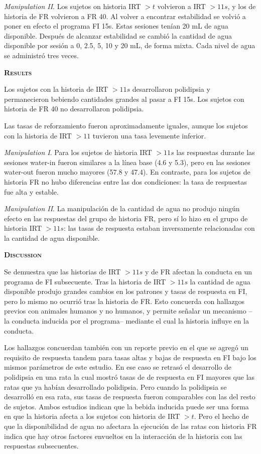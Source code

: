 \documentclass[a4paper,12pt]{article}
\begin{document}
{\itshape Manipulation II}. Los sujetos on historia IRT $> t$ volvieron a IRT $> 11s$, y los de historia de FR volvieron a FR 40. Al volver a encontrar estabilidad se volvió a poner en efecto el programa FI 15s. Estas sesiones tenían 20 mL de agua disponible. Después de alcanzar estabilidad se cambió la cantidad de agua disponible por sesión a 0, 2.5, 5, 10 y 20 mL, de forma mixta. Cada nivel de agua se administró tres veces.

{\scshape\bfseries Results}

Los sujetos con la historia de IRT $> 11s$ desarrollaron polidipsia y permanecieron bebiendo cantidades grandes al pasar a FI 15s. Los sujetos con historia de FR 40 no desarrollaron polidipsia.

Las tasas de reforzamiento fueron aproximadamente iguales, aunque los sujetos con la historia de IRT $> 11$ tuvieron una tasa levemente inferior.

{\itshape Manipulation I}. Para los sujetos de historia IRT $> 11s$ las respuestas durante las sesiones water-in fueron similares a la línea base (4.6 y 5.3), pero en las sesiones water-out fueron mucho mayores (57.8 y 47.4). En contraste, para los sujetos de historia FR no hubo diferencias entre las dos condiciones: la tasa de respuestas fue alta y estable.

{\itshape Manipulation II}. La manipulación de la cantidad de agua no produjo ningún efecto en las respuestas del grupo de historia FR, pero sí lo hizo en el grupo de historia IRT $> 11s$: las tasas de respuesta estaban inversamente relacionadas con la cantidad de agua disponible.

{\scshape\bfseries Discussion}

Se demuestra que las historias de IRT $> 11s$ y de FR afectan la conducta en un programa de FI subsecuente. Tras la historia de IRT $> 11s$ la cantidad de agua disponible produjo grandes cambios en los patrones y tasas de respuesta en FI, pero lo mismo no ocurrió tras la historia de FR. Esto concuerda con hallazgos previos con animales humanos y no humanos, y permite señalar un mecanismo --la conducta inducida por el programa-- mediante el cual la historia influye en la conducta.

Los hallazgos concuerdan también con un reporte previo en el que se agregó un requisito de respuesta tandem para tasas altas y bajas de respuesta en FI bajo los mismos parámetros de este estudio. En ese caso se retrasó el desarrollo de polidipsia en una rata la cual mostró tasas de de respuesta en FI mayores que las ratas que ya habían desarrollado polidipsia. Pero cuando la polidipsia se desarrolló en esa rata, sus tasas de respuesta fueron comparables con las del resto de sujetos. Ambos estudios indican que la bebida inducida puede ser una forma en que la historia afecta a los sujetos con historia de IRT $> t$. Pero el hecho de que la disponibilidad de agua no afectara la ejecución de las ratas con historia FR indica que hay otros factores envueltos en la interacción de la historia con las respuestas subsecuentes.
\end{document}
